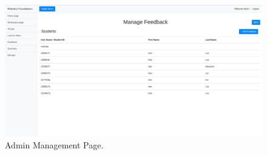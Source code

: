 \documentclass{l4proj}
\begin{document}
\begin{appendices}
\begin{figure}[h]
    \centering
    \includegraphics[scale=0.20]{images/view_users.png}
    \caption{Admin Management Page.}
\end{figure}


\end{appendices}





\renewcommand{\thechapter}{0} 

\end{document}
